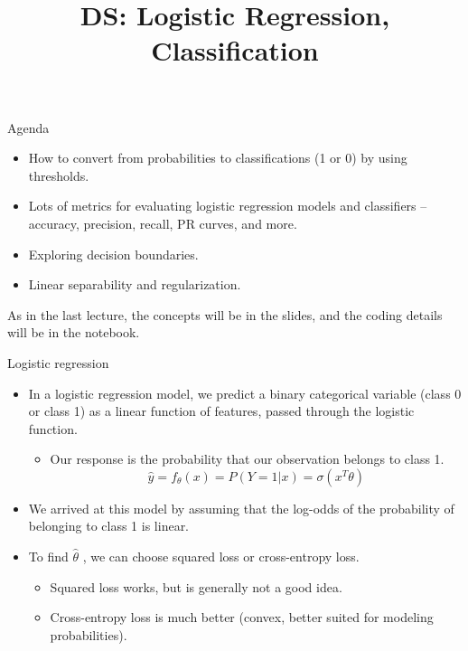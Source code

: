 \documentclass[aspectratio=169]{../latex_main/tntbeamer}  %
\title[Introduction]{DS: Logistic Regression, Classification}
\subtitle{}
\begin{document}
	
	\maketitle
	\begin{frame}{Agenda}
	    \begin{itemize}
	        \item How to convert from probabilities to classifications (1 or 0) by using thresholds.
	        \item Lots of metrics for evaluating logistic regression models and classifiers – accuracy, precision, recall, PR curves, and more.
	        \item Exploring decision boundaries.
	        \item Linear separability and regularization.
	    \end{itemize}
	    \bigskip
	    As in the last lecture, the concepts will be in the slides, and the coding details will be in the notebook.
	\end{frame}
	
	
	\begin{frame}{Logistic regression}
	    \begin{itemize}
	        \item In a logistic regression model, we predict a binary categorical variable (class 0 or class 1) as a linear function of features, passed through the logistic function.
	        \begin{itemize}
	            \item Our response is the probability that our observation belongs to class 1.
	            \begin{equation*}
	                \hat{y} = f_\theta(x) = P(Y=1|x) = \sigma (x^T\theta)
	            \end{equation*}
	        \end{itemize}
	        \item We arrived at this model by assuming that the log-odds of the probability of belonging to class 1 is linear.
	        \item To find  $\hat{\theta}$  , we can choose squared loss or cross-entropy loss.
	        \begin{itemize}
	            \item Squared loss works, but is generally not a good idea.
	            \item Cross-entropy loss is much better (convex, better suited for modeling probabilities).
	        \end{itemize}
	    \end{itemize}
	\end{frame}
\end{document}
